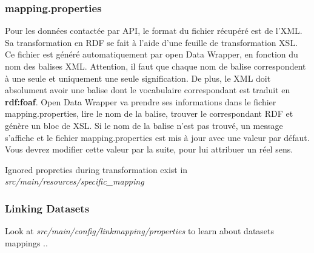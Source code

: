 \documentclass[a4paper]{article}
\begin{document}
\subsubsection{mapping.properties}

Pour les données contactée par API, le format du fichier récupéré est de l'XML.
Sa transformation en RDF se fait à l'aide d'une feuille de transformation XSL.
Ce fichier est généré automatiquement par open Data Wrapper, en fonction du nom
des balises XML. Attention, il faut que chaque nom de balise correspondent à une
seule et uniquement une seule signification. De plus, le XML doit absolument
avoir une balise dont le vocabulaire correspondant est traduit en
\textbf{rdf:foaf}. Open Data Wrapper va prendre ses informations dans le
fichier mapping.properties, lire le nom de la balise, trouver le correspondant
RDF et génère un bloc de XSL. Si le nom de la balise n'est pas trouvé, un
message s'affiche et le fichier mapping.properties est mis à jour avec une
valeur par défaut. Vous devrez modifier cette valeur par la suite, pour lui
attribuer un réel sens.

Ignored propreties during transformation exist in \emph{src/main/resources/specific\_mapping}

\subsubsection{Linking Datasets}
Look at \emph{src/main/config/linkmapping/properties}  to learn about datasets mappings ..
\end{document}
